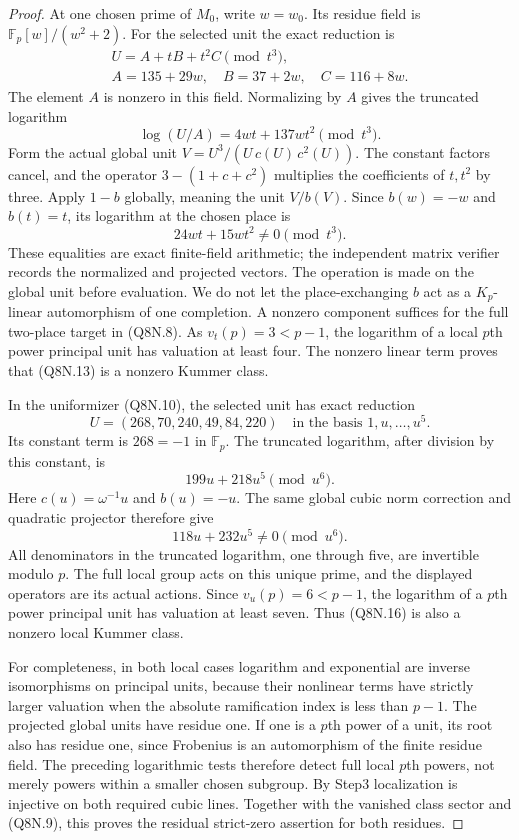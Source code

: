 \begin{proof}
At one chosen prime of $M_0$, write $w=w_0$.
Its residue field is $\mathbb F_p[w]/(w^2+2)$.
For the selected unit the exact reduction is
\[
 \begin{gathered}
 U=A+tB+t^2C\pmod{t^3},\\
 A=135+29w,\quad B=37+2w,\quad C=116+8w.
 \end{gathered}
 \tag{Q8N.11}
\]
The element $A$ is nonzero in this field.
Normalizing by $A$ gives the truncated logarithm
\[
              \log(U/A)=4wt+137wt^2\pmod{t^3}.
 \tag{Q8N.12}
\]
Form the actual global unit
$V=U^3/(U\,c(U)\,c^2(U))$.
The constant factors cancel, and the operator
$3-(1+c+c^2)$ multiplies the coefficients of $t,t^2$ by three.
Apply $1-b$ globally, meaning the unit $V/b(V)$.
Since $b(w)=-w$ and $b(t)=t$, its logarithm at the chosen place is
\[
                    24wt+15wt^2\ne0\pmod{t^3}.
 \tag{Q8N.13}
\]
These equalities are exact finite-field arithmetic; the independent
matrix verifier records the normalized and projected vectors.
The operation is made on the global unit before evaluation.
We do not let the place-exchanging $b$ act as a $K_p$-linear
automorphism of one completion.  A nonzero component suffices
for the full two-place target in (Q8N.8).
As $v_t(p)=3<p-1$, the logarithm of a local $p$th power principal
unit has valuation at least four.
The nonzero linear term proves that (Q8N.13) is a nonzero Kummer class.

In the uniformizer (Q8N.10), the selected unit has exact reduction
\[
 U=(268,70,240,49,84,220)
                       \quad\text{in the basis }1,u,\ldots,u^5.
 \tag{Q8N.14}
\]
Its constant term is $268=-1$ in $\mathbb F_p$.
The truncated logarithm, after division by this constant, is
\[
                    199u+218u^5\pmod{u^6}.
 \tag{Q8N.15}
\]
Here $c(u)=\omega^{-1}u$ and $b(u)=-u$.
The same global cubic norm correction and quadratic projector
therefore give
\[
                   118u+232u^5\ne0\pmod{u^6}.
 \tag{Q8N.16}
\]
All denominators in the truncated logarithm, one through five,
are invertible modulo $p$.
The full local group acts on this unique prime, and the displayed
operators are its actual actions.
Since $v_u(p)=6<p-1$, the logarithm of a $p$th power principal
unit has valuation at least seven.
Thus (Q8N.16) is also a nonzero local Kummer class.

For completeness, in both local cases logarithm and exponential
are inverse isomorphisms on principal units, because their
nonlinear terms have strictly larger valuation when the absolute
ramification index is less than $p-1$.
The projected global units have residue one.
If one is a $p$th power of a unit, its root also has residue one,
since Frobenius is an automorphism of the finite residue field.
The preceding logarithmic tests therefore detect full local
$p$th powers, not merely powers within a smaller chosen subgroup.
By Step3 localization is injective on both required cubic lines.
Together with the vanished class sector and (Q8N.9), this proves
the residual strict-zero assertion for both residues.


\end{proof}
